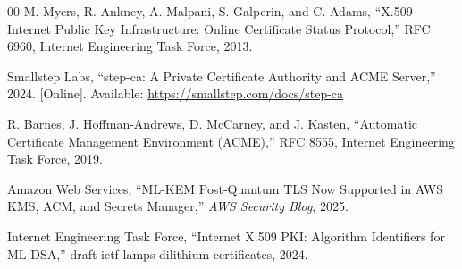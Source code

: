 \documentclass[conference]{IEEEtran}
\begin{document}
\begin{thebibliography}{00}
M. Myers, R. Ankney, A. Malpani, S. Galperin, and C. Adams, ``X.509 Internet Public
Key Infrastructure: Online Certificate Status Protocol,'' RFC 6960, Internet
Engineering Task Force, 2013.

Smallstep Labs, ``step-ca: A Private Certificate Authority and ACME Server,''
2024. [Online]. Available: \url{https://smallstep.com/docs/step-ca}

R. Barnes, J. Hoffman-Andrews, D. McCarney, and J. Kasten, ``Automatic Certificate
Management Environment (ACME),'' RFC 8555, Internet Engineering Task Force, 2019.

Amazon Web Services, ``ML-KEM Post-Quantum TLS Now Supported in AWS KMS, ACM, and
Secrets Manager,'' \textit{AWS Security Blog}, 2025.

Internet Engineering Task Force, ``Internet X.509 PKI: Algorithm Identifiers for
ML-DSA,'' draft-ietf-lamps-dilithium-certificates, 2024.

\end{thebibliography}
\end{document}
